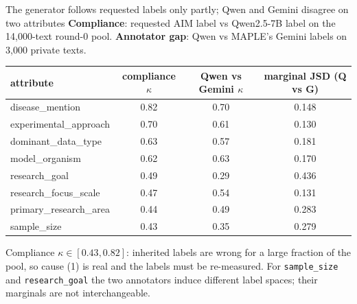 \documentclass[11pt,aspectratio=169]{beamer}
\begin{document}
\begin{frame}{The generator follows requested labels only partly; Qwen and Gemini disagree on two attributes}
\textbf{Compliance}: requested AIM label vs Qwen2.5-7B label on the 14{,}000-text round-0 pool. \textbf{Annotator gap}: Qwen vs MAPLE's Gemini labels on 3{,}000 private texts.

\medskip
\centering\small
\begin{tabular}{lccc}
\toprule
attribute & compliance $\kappa$ & Qwen vs Gemini $\kappa$ & marginal JSD (Q vs G)\\
\midrule
disease\_mention         & 0.82 & 0.70 & 0.148 \\
experimental\_approach   & 0.70 & 0.61 & 0.130 \\
dominant\_data\_type     & 0.63 & 0.57 & 0.181 \\
model\_organism          & 0.62 & 0.63 & 0.170 \\
research\_goal           & 0.49 & \alert{0.29} & \alert{0.436} \\
research\_focus\_scale   & 0.47 & 0.54 & 0.131 \\
primary\_research\_area  & 0.44 & 0.49 & 0.283 \\
sample\_size             & 0.43 & \alert{0.35} & \alert{0.279} \\
\bottomrule
\end{tabular}

\raggedright
\medskip
Compliance $\kappa \in [0.43, 0.82]$: inherited labels are wrong for a large fraction of the pool, so cause (1) is real and the labels must be re-measured. For \texttt{sample\_size} and \texttt{research\_goal} the two annotators induce different label spaces; their marginals are not interchangeable.
\end{frame}
\end{document}
